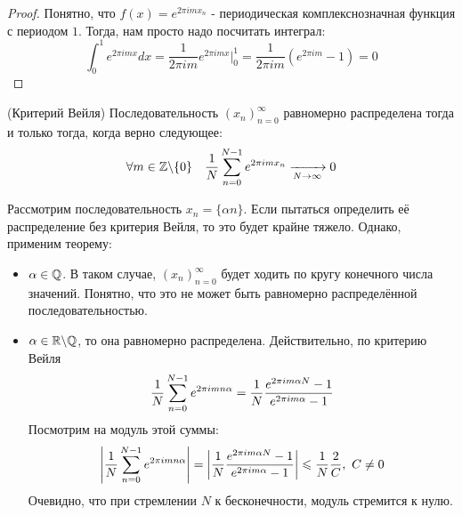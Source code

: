 \begin{proof}
	Понятно, что $f(x) = e^{2\pi im x_n}$ - периодическая комплекснозначная функция с периодом $1$. Тогда, нам просто надо посчитать интеграл:
	\[
		\int_0^1 e^{2\pi im x}dx = \frac{1}{2\pi im} e^{2\pi im x} \Big|_0^1 = \frac{1}{2\pi im} (e^{2\pi im} - 1) = 0
	\]
\end{proof}

\begin{theorem} (Критерий Вейля)
	Последовательность $(x_n)_{n = 0}^\infty$ равномерно распределена тогда и только тогда, когда верно следующее:
	\[
		\forall m \in \mathbb{Z} \backslash \{0\} \quad \frac{1}{N} \sum\limits_{n = 0}^{N - 1} e^{2\pi im x_n} \xrightarrow[N \to \infty]{} 0
	\]
\end{theorem}

\begin{example}
	Рассмотрим последовательность $x_n = \{\alpha n\}$. Если пытаться определить её распределение без критерия Вейля, то это будет крайне тяжело. Однако, применим теорему:
	\begin{itemize}
		\item $\alpha \in \mathbb{Q}$. В таком случае, $(x_n)_{n = 0}^\infty$ будет ходить по кругу конечного числа значений. Понятно, что это не может быть равномерно распределённой последовательностью.
		
		\item $\alpha \in \mathbb{R} \backslash \mathbb{Q}$, то она равномерно распределена. Действительно, по критерию Вейля
		\[
			\frac{1}{N} \sum\limits_{n = 0}^{N - 1} e^{2 \pi im n\alpha} = \frac{1}{N} \frac{e^{2\pi im \alpha N} - 1}{e^{2\pi im \alpha} - 1}
		\]
		Посмотрим на модуль этой суммы:
		\[
			\left|\frac{1}{N} \sum\limits_{n = 0}^{N - 1} e^{2 \pi im n\alpha}\right| = \left|\frac{1}{N} \frac{e^{2\pi im \alpha N} - 1}{e^{2\pi im \alpha} - 1}\right| \leqslant \frac{1}{N} \frac{2}{C},\ C \neq 0
		\]
		Очевидно, что при стремлении $N$ к бесконечности, модуль стремится к нулю.
	\end{itemize}
\end{example}